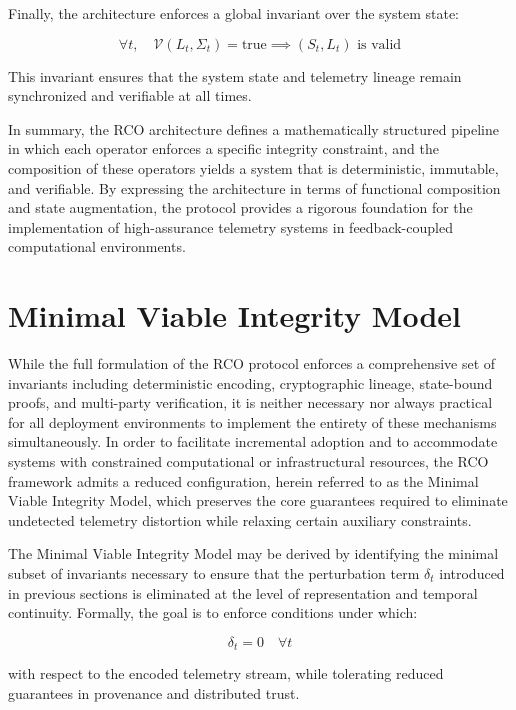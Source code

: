 Finally, the architecture enforces a global invariant over the system state:

\begin{equation}
\forall t, \quad \mathcal{V}(L_t, \Sigma_t) = \text{true} \implies (S_t, L_t) \text{ is valid}
\end{equation}

This invariant ensures that the system state and telemetry lineage remain synchronized and verifiable at all times.

In summary, the RCO architecture defines a mathematically structured pipeline in which each operator enforces a specific integrity constraint, and the composition of these operators yields a system that is deterministic, immutable, and verifiable. By expressing the architecture in terms of functional composition and state augmentation, the protocol provides a rigorous foundation for the implementation of high-assurance telemetry systems in feedback-coupled computational environments.

\section{Minimal Viable Integrity Model}

While the full formulation of the RCO protocol enforces a comprehensive set of invariants including deterministic encoding, cryptographic lineage, state-bound proofs, and multi-party verification, it is neither necessary nor always practical for all deployment environments to implement the entirety of these mechanisms simultaneously. In order to facilitate incremental adoption and to accommodate systems with constrained computational or infrastructural resources, the RCO framework admits a reduced configuration, herein referred to as the Minimal Viable Integrity Model, which preserves the core guarantees required to eliminate undetected telemetry distortion while relaxing certain auxiliary constraints.

The Minimal Viable Integrity Model may be derived by identifying the minimal subset of invariants necessary to ensure that the perturbation term $\delta_t$ introduced in previous sections is eliminated at the level of representation and temporal continuity. Formally, the goal is to enforce conditions under which:

\begin{equation}
\delta_t = 0 \quad \forall t
\end{equation}

with respect to the encoded telemetry stream, while tolerating reduced guarantees in provenance and distributed trust.

